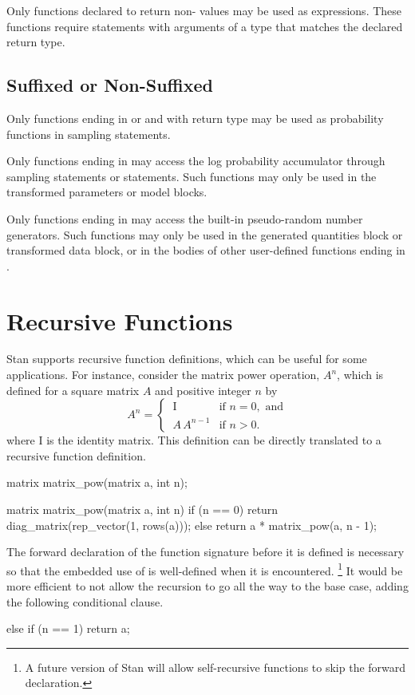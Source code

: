 Only functions declared to return non- values may be used
as expressions.  These functions require  statements with
arguments of a type that matches the declared return type.

\subsection{Suffixed or Non-Suffixed}

Only functions ending in  or  and with
return type  may be used as probability functions in
sampling statements.

Only functions ending in  may access the log probability
accumulator through sampling statements or 
statements.  Such functions may only be used in the transformed
parameters or model blocks.

Only functions ending in  may access the built-in
pseudo-random number generators.  Such functions may only be used in
the generated quantities block or transformed data block, or in the
bodies of other user-defined functions ending in .


\section{Recursive Functions}

Stan supports recursive function definitions, which can be useful for
some applications.  For instance, consider the matrix power operation,
$A^n$, which is defined for a square matrix $A$ and positive integer
$n$ by
\[
A^n 
=
\begin{cases}
\ \mbox{I} & \mbox{if } n = 0, \mbox{ and}
\\[3pt]
\ A \, A^{n-1} & \mbox{if } n > 0.
\end{cases}
\]
%
where $\mbox{I}$ is the identity matrix.  This definition can be
directly translated to a recursive function definition.
%
\begin{stancode}
  matrix matrix_pow(matrix a, int n);

  matrix matrix_pow(matrix a, int n) {
    if (n == 0)
      return diag_matrix(rep_vector(1, rows(a)));
    else 
      return a *  matrix_pow(a, n - 1);
  }
\end{stancode}
%
The forward declaration of the function signature before it is defined
is necessary so that the embedded use of  is
well-defined when it is encountered.%
%
\footnote{A future version of Stan will allow self-recursive functions
  to skip the forward declaration.}
%
It would be more efficient to not allow the recursion to go all the
way to the base case, adding the following conditional clause.
%
\begin{stancode}
    else if (n == 1)
      return a;
\end{stancode}



